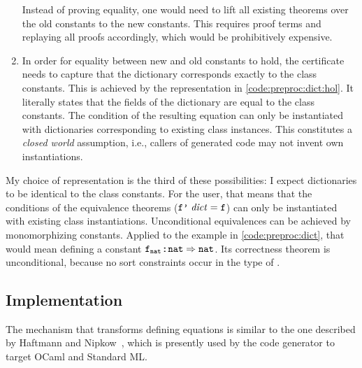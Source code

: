 \begin{enumerate}
    Instead of proving equality, one would need to lift all existing theorems over the old constants to the new constants.
    This requires proof terms and replaying all proofs accordingly, which would be prohibitively expensive.
  \item
    In order for equality between new and old constants to hold, the certificate needs to capture that the dictionary corresponds exactly to the class constants.
    This is achieved by the representation in \cref{code:preproc:dict:hol}.
    It literally states that the fields of the dictionary are equal to the class constants.
    The condition of the resulting equation can only be instantiated with dictionaries corresponding to existing class instances.
    This constitutes a \emph{closed world} assumption, i.e., callers of generated code may not invent own instantiations.
\end{enumerate}

\noindent
My choice of representation is the third of these possibilities:
I expect dictionaries to be identical to the class constants.
For the user, that means that the conditions of the equivalence theorems ($\texttt{\textup{f'}}\;\mathit{dict} = \texttt{\textup{f}}$) can only be instantiated with existing class instantiations.
Unconditional equivalences can be achieved by monomorphizing constants.
Applied to the example in \cref{code:preproc:dict}, that would mean defining a constant $\texttt{\textup{f}}_{\texttt{\textup{nat}}} \mathbin{:\!\!:} \texttt{\textup{nat}} \Rightarrow \texttt{\textup{nat}}$.
Its correctness theorem is unconditional, because no sort constraints occur in the type of .

\subsection{Implementation}
\label{sec:preproc:dict:elim:impl}

The mechanism that transforms defining equations is similar to the one described by Haftmann and Nipkow~\cite[\S 4]{haftmann2010codegeneration}, which is presently used by the code generator to target OCaml and Standard ML.

